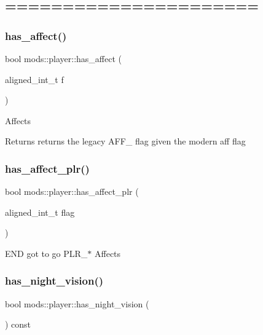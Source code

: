 \subsection*{====================== }\mbox{\label{classmods_1_1player_ae7ad590bc136eac7a54ed0071a3e882b}} 
\subsubsection{\texorpdfstring{has\+\_\+affect()}{has\_affect()}}
{\footnotesize\ttfamily bool mods\+::player\+::has\+\_\+affect (\begin{DoxyParamCaption}\item[{aligned\+\_\+int\+\_\+t}]{f }\end{DoxyParamCaption})}

Affects \begin{DoxyReturn}{Returns}
returns the legacy A\+F\+F\+\_\+ flag given the modern aff flag 
\end{DoxyReturn}
\mbox{\label{classmods_1_1player_ae07901c25cbe93b8c259720f1662e5d3}} 
\subsubsection{\texorpdfstring{has\+\_\+affect\+\_\+plr()}{has\_affect\_plr()}}
{\footnotesize\ttfamily bool mods\+::player\+::has\+\_\+affect\+\_\+plr (\begin{DoxyParamCaption}\item[{aligned\+\_\+int\+\_\+t}]{flag }\end{DoxyParamCaption})}

E\+ND got to go P\+L\+R\+\_\+$\ast$ Affects \mbox{\label{classmods_1_1player_a9631c9d8b2bccdf598d84756fac2aeb9}} 
\subsubsection{\texorpdfstring{has\+\_\+night\+\_\+vision()}{has\_night\_vision()}}
{\footnotesize\ttfamily bool mods\+::player\+::has\+\_\+night\+\_\+vision (\begin{DoxyParamCaption}{ }\end{DoxyParamCaption}) const}

